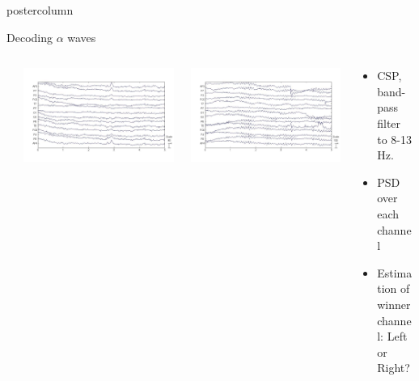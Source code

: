 \documentclass[final]{beamer}
\begin{document}
\begin{frame}
\begin{columns}
\begin{column}{.49\textwidth}
\begin{beamercolorbox}[center,wd=\textwidth]{postercolumn}
\begin{minipage}[T]{.95\textwidth}
{\begin{block}{Decoding $ \alpha$  waves}
\begin{itemize}
\begin{enumerate}
                \begin{columns}
                \setlength{\tabcolsep}{0em}
              	\begin{column}{.05\textwidth}
				\end{column}
              	\begin{column}{.18\textwidth}
				\centering \includegraphics[width=0.95\linewidth]{images/viola/eeglab1}
				\end{column}
				\begin{column}{.18\textwidth}
				\centering \includegraphics[width=0.95\linewidth]{images/viola/eeglab2}
				\end{column}

				\begin{column}{.78\textwidth}	
				\begin{itemize}
				\item CSP,  band-pass filter to 8-13 Hz.
				\item PSD over each channel
				\item Estimation of winner channel: Left or Right?
				\end{itemize}
                \end{column}  			
				

\end{columns}
\end{enumerate}
\end{itemize}
\end{block}}
\end{minipage}
\end{beamercolorbox}
\end{column}
\end{columns}
\end{frame}
\end{document}
